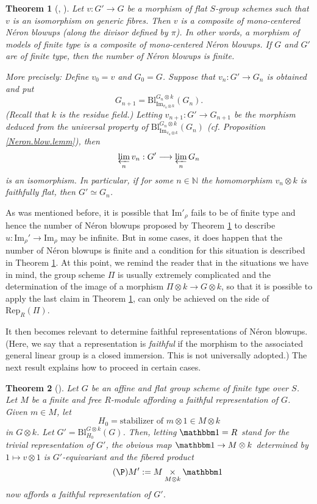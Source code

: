 \documentclass[10pt]{alggeom}
\newtheorem{thm}{Theorem}[section]
\theoremstyle{definition}
\numberwithin{equation}{section}
\begin{document}
\begin{thm}[{\cite[Theorem 1.4]{WW80}, \cite[Theorem 2.11]{duong-hai-dos_santos18}}]\label{thWW} Let $v:G' \to G $ be a morphism of flat $S$-group schemes      such that $v$ is an isomorphism  on generic fibres. Then $v$ is a   composite of mono-centered N\'eron blowups (along the divisor defined by $\pi$). In other words, a morphism of models of finite type is a composite of mono-centered N\'eron blowups. If $G$ and $G'$ are of finite type, then the number of N\'eron blowups is finite. 

More precisely: 
Define $v_0=v$ and $G_0=G$. Suppose that $v_n:G'\to G_n$ is obtained and put     
\[
G_{n+1}=\mathrm{Bl}_{\mathrm{Im}_{v_n\otimes k}}^{G_n\otimes k}(G_n).
\](Recall that $k$ is the residue field.)
Letting $v_{n+1}:G'\to G_{n+1}$ be the morphism deduced from the universal property of $\mathrm{Bl}_{\mathrm{Im}_{v_n\otimes k}}^{G_n\otimes k}(G_n)$ (cf. Proposition \ref{Neron.blow.lemm}), then 
\[
\varprojlim_nv_n:G'\longrightarrow \varprojlim_nG_n
\]
is an isomorphism. In particular, if for some $n\in\mathbb N$ the homomorphism  $v_n\otimes k$ is faithfully flat, then $G'\simeq G_n$.  
\end{thm}

As was mentioned before, it is   possible that $\mathrm{Im}'_\rho$ fails to be of finite type and hence the number of N\'eron blowups proposed by Theorem \ref{thWW} to   describe  $u:\mathrm{Im}_\rho'\to\mathrm{Im}_\rho$
may  be infinite. But in some cases, it does happen that  the number of N\'eron blowups is finite and a condition for this situation is described in  
 Theorem \ref{thWW}.
At this point, we remind the reader that in the situations  we have in mind, the group scheme $\Pi$ is usually extremely complicated and the determination of the image of a morphism $\Pi\otimes k\to G\otimes k$, so that it is possible to apply the last claim in Theorem \ref{thWW}, can only be achieved on the side of $\mathrm{Rep}_R(\Pi)$. 

It then becomes relevant to determine faithful representations of N\'eron blowups. (Here, we say that a representation is {\it faithful} if the morphism to the associated general linear group is a closed immersion. This is not universally adopted.) The next result explains how to proceed in certain cases.
 

\begin{thm}[{\cite[Corollary 3.6]{duong-hai-dos_santos18}}]Let $G$ be an affine and flat group scheme of finite type over $S$. Let $M$ be a finite and free $R$-module affording a faithful representation of $G$. Given $m\in M$, let 
\[
H_0 =\text{stabilizer of $m\otimes1\in M\otimes k$}
\] 
in $G\otimes k$. Let $G'=\mathrm{Bl}_{H_0}^{G\otimes k}(G)$.  Then, letting $\mathbbm1=R$ stand for the trivial representation of $G'$, the obvious map $\mathbbm1\to M\otimes k$ determined by $1\mapsto v\otimes 1$
is   $G'$-equivariant and the fibered product 
\[\tag{$\P$}
M':=M\underset {M\otimes k}{\times}\mathbbm1
\]
now affords a faithful  representation of $G'$.
\end{thm}
\end{document}
